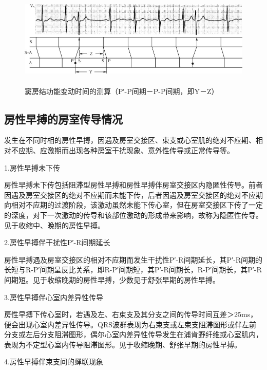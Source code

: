 \begin{figure}[!htbp]
 \centering
 \includegraphics[width=5.71875in,height=1.82292in]{./images/Image00160.jpg}
 \captionsetup{justification=centering}
 \caption{窦房结功能变动时间的测算（P′-P间期－P-P间期，即Y－Z）}
 \label{fig11-8}
  \end{figure} 

\protect\hypertarget{text00018.htmlux5cux23subid138}{}{}

\subsection{房性早搏的房室传导情况}

发生在不同时相的房性早搏，因遇及房室交接区、束支或心室肌的绝对不应期、相对不应期、应激期而出现各种房室干扰现象、意外性传导或正常传导等。

1.房性早搏未下传

房性早搏未下传包括阻滞型房性早搏和房性早搏伴房室交接区内隐匿性传导。前者因遇及房室交接区的绝对不应期而未能下传，后者因遇及房室交接区的绝对不应期向相对不应期的过渡阶段，该激动虽然未能下传心室，但在房室交接区下传了一定的深度，对下一次激动的传导和该部位激动的形成带来影响，故称为隐匿性传导。见于收缩中、晚期的房性早搏。

2.房性早搏伴干扰性P′-R间期延长

房性早搏遇及房室交接区的相对不应期而发生干扰性P′-R间期延长，其P′-R间期的长短与R-P′间期呈反比关系，即R-P′间期短，其P′-R间期长，R-P′间期长，其P′-R间期短。见于收缩晚期的房性早搏，少数见于舒张早期的房性早搏。

3.房性早搏伴心室内差异性传导

房性早搏下传心室时，若遇及左、右束支及其分支之间的传导时间互差＞25ms，便会出现心室内差异性传导。QRS波群表现为右束支或左束支阻滞图形或伴左前分支或左后分支阻滞图形，偶尔心室内差异性传导发生在浦肯野纤维或心室肌内，表现为不定型心室内传导阻滞图形。见于收缩晚期、舒张早期的房性早搏。

4.房性早搏伴束支间的蝉联现象

